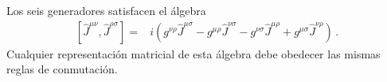 \begin{subappendices}
Los seis generadores satisfacen el álgebra
\begin{align}
\label{eq:lrtalg}
  \left[\widehat{J}^{\mu\nu},\widehat{J}^{\rho\sigma}\right]=&
i(g^{\nu\rho}\widehat{J}^{\mu\sigma}-g^{\mu\rho}\widehat{J}^{\nu\sigma}-g^{\nu\sigma}\widehat{J}^{\mu\rho}+g^{\mu\sigma}\widehat{J}^{\nu\rho})\,.
\end{align}
Cualquier representación matricial de esta álgebra debe obedecer las mismas reglas de conmutación.


\end{subappendices}


%
